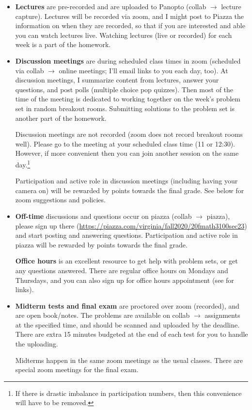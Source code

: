 \documentclass[oneside,11pt]{amsart}
\begin{document}
\begin{itemize}
	\item \textbf{Lectures} are pre-recorded and are uploaded to Panopto (collab $\to$ lecture capture). 
		Lectures will be recorded via zoom, and I might post to Piazza the information
		on when they are recorded, so that if you are interested and able you can watch lectures
		live.
		Watching lectures (live or recorded)
		for each week is a part of the homework.
	\item \textbf{Discussion meetings} are during scheduled class times
		in zoom (scheduled via collab
		$\to$ online meetings; I'll email links to you each day, too). At
		discussion
		meetings, I summarize content from lectures, answer your 
		questions, and 
		post polls (multiple choice pop quizzes). Then most of the time
		of the meeting is dedicated to working together on the week's problem set in random breakout rooms.
		Submitting solutions to the problem set is another part of the homework.

		Discussion meetings are not recorded (zoom does not record breakout rooms well). 
		Please go to the meeting at your scheduled class time (11 or 12:30).
		However, if more convenient then 
		you can join another session on the same day.\footnote{If there is drastic imbalance
		in participation numbers, then this convenience will have to be removed.}

		Participation and active role in discussion meetings (including having 
		your camera on)
		will be rewarded by points towards the final grade.
		See  below for zoom suggestions and policies.

	\item \textbf{Off-time} discussions and questions 
		occur on piazza (collab $\to$ piazza), please sign up there 
		(\url{https://piazza.com/virginia/fall2020/20fmath3100sec23})
		and start
		posting and answering questions. 
		Participation and active role in piazza will be rewarded by points towards the final grade.

		\textbf{Office hours} is an excellent resource to get help with problem sets,
		or get any questions answered. There are regular office hours
		on Mondays and Thursdays, and you can also sign up for office hours appointment (see 
		for links).

	\item \textbf{Midterm tests and final exam} are proctored over zoom (recorded), and are open book/notes. 
		The problems are available on collab $\to$ assignments at the specified time, and 
		should be scanned and uploaded by the deadline. There are extra 15 minutes budgeted at the 
		end of each test for you to handle the uploading.

		Midterms happen in the same zoom meetings as the usual classes. There are special zoom meetings 
		for the final exam.
\end{itemize}
\end{document}
